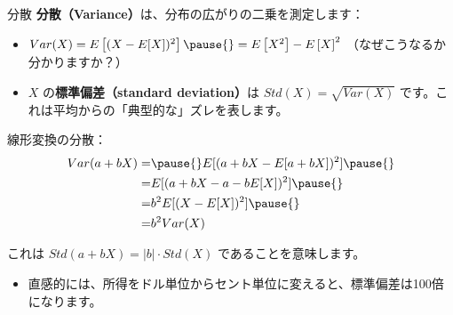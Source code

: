 \documentclass[11pt,handout]{beamer}
\begin{document}
\begin{frame}{分散}
\vspace{0.2cm}
\textbf{分散（Variance）}は、分布の広がりの二乗を測定します：

\begin{itemize}
\item $Var(X)=E\left[(X-E[X])^2\right]\pause{}=E\left[X^2\right]-E\left[X\right]^2$ （なぜこうなるか分かりますか？）
\vspace{0.1cm}\pause{}
\item $X$ の\textbf{標準偏差（standard deviation）}は $Std(X)=\sqrt{Var(X)}$ です。これは平均からの「典型的な」ズレを表します。
\end{itemize}
\vspace{0.2cm}
\pause{}

線形変換の分散：
\begin{align*}
Var(a+bX)=&\pause{}E[(a+bX-E[a+bX])^2]\pause{} \\
 = &E[(a+bX-a-bE[X])^2]\pause{} \\
= & b^2 E[(X-E[X])^2]\pause{} \\
 =& b^2Var(X)
\end{align*}

\pause{}
これは $Std(a + bX) = |b| \cdot Std(X)$ であることを意味します。
	\begin{itemize}
		\item 
		直感的には、所得をドル単位からセント単位に変えると、標準偏差は100倍になります。
	\end{itemize}

\end{frame}
\end{document}
